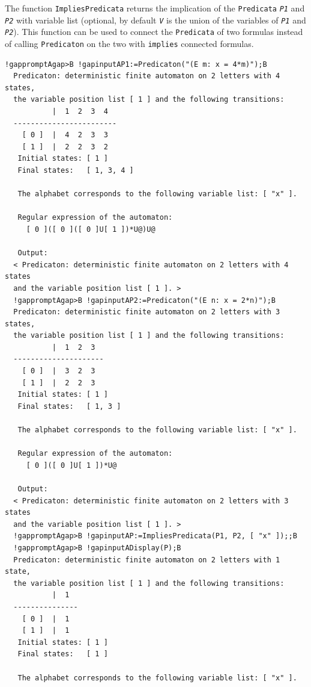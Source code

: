 \documentclass[a4paper,11pt]{report}
\begin{document}
{{{ The function \texttt{ImpliesPredicata} returns the implication of the \texttt{Predicata} \mbox{\texttt{\mdseries\slshape P1}} and \mbox{\texttt{\mdseries\slshape P2}} with variable list (optional, by default \mbox{\texttt{\mdseries\slshape V}} is the union of the variables of \mbox{\texttt{\mdseries\slshape P1}} and \mbox{\texttt{\mdseries\slshape P2}}). This function can be used to connect the \texttt{Predicata} of two formulas instead of calling \texttt{Predicaton} on the two with \texttt{implies} connected formulas. 
\begin{Verbatim}[commandchars=!AB,fontsize=\small,frame=single,label=Example]
  !gappromptAgap>B !gapinputAP1:=Predicaton("(E m: x = 4*m)");B
  Predicaton: deterministic finite automaton on 2 letters with 4 states, 
  the variable position list [ 1 ] and the following transitions:
           |  1  2  3  4  
  ------------------------
    [ 0 ]  |  4  2  3  3  
    [ 1 ]  |  2  2  3  2  
   Initial states: [ 1 ]
   Final states:   [ 1, 3, 4 ]
  
   The alphabet corresponds to the following variable list: [ "x" ].
  
   Regular expression of the automaton:
     [ 0 ]([ 0 ]([ 0 ]U[ 1 ])*U@)U@
  
   Output:
  < Predicaton: deterministic finite automaton on 2 letters with 4 states 
  and the variable position list [ 1 ]. >
  !gappromptAgap>B !gapinputAP2:=Predicaton("(E n: x = 2*n)");B
  Predicaton: deterministic finite automaton on 2 letters with 3 states, 
  the variable position list [ 1 ] and the following transitions:
           |  1  2  3  
  ---------------------
    [ 0 ]  |  3  2  3  
    [ 1 ]  |  2  2  3  
   Initial states: [ 1 ]
   Final states:   [ 1, 3 ]
  
   The alphabet corresponds to the following variable list: [ "x" ].
  
   Regular expression of the automaton:
     [ 0 ]([ 0 ]U[ 1 ])*U@
  
   Output:
  < Predicaton: deterministic finite automaton on 2 letters with 3 states 
  and the variable position list [ 1 ]. >
  !gappromptAgap>B !gapinputAP:=ImpliesPredicata(P1, P2, [ "x" ]);;B
  !gappromptAgap>B !gapinputADisplay(P);B
  Predicaton: deterministic finite automaton on 2 letters with 1 state, 
  the variable position list [ 1 ] and the following transitions:
           |  1  
  ---------------
    [ 0 ]  |  1  
    [ 1 ]  |  1  
   Initial states: [ 1 ]
   Final states:   [ 1 ]
  
   The alphabet corresponds to the following variable list: [ "x" ].
\end{Verbatim}
 }

}}
\end{document}
